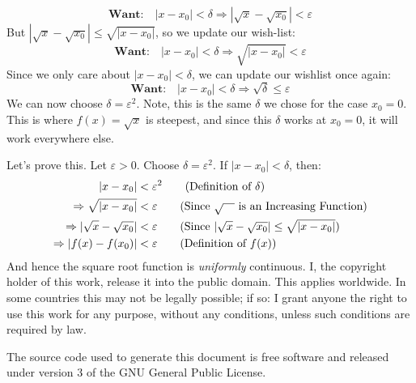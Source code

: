 \documentclass{article}
\theoremstyle{normal}
\theoremstyle{plain}
\begin{document}
    \begin{equation}
        \textbf{Want:}\quad
        |x-x_{0}|<\delta
        \Rightarrow
        |\sqrt{x}-\sqrt{x_{0}}|<\varepsilon
    \end{equation}
    But $|\sqrt{x}-\sqrt{x_{0}}|\leq\sqrt{|x-x_{0}|}$, so we update our
    wish-list:
    \begin{equation}
        \textbf{Want:}\quad
        |x-x_{0}|<\delta
        \Rightarrow
        \sqrt{|x-x_{0}|}<\varepsilon
    \end{equation}
    Since we only care about $|x-x_{0}|<\delta$, we can update our wishlist
    once again:
    \begin{equation}
        \textbf{Want:}\quad
        |x-x_{0}|<\delta
        \Rightarrow
        \sqrt{\delta}\leq\varepsilon
    \end{equation}
    We can now choose $\delta=\varepsilon^{2}$. Note, this is the same
    $\delta$ we chose for the case $x_{0}=0$. This is where $f(x)=\sqrt{x}$ is
    steepest, and since this $\delta$ works at $x_{0}=0$, it will work
    everywhere else.
    \par\hfill\par
    Let's prove this. Let $\varepsilon>0$. Choose $\delta=\varepsilon^{2}$.
    If $|x-x_{0}|<\delta$, then:
    \begin{align}
        |x-x_{0}|&<\varepsilon^{2}
            \tag{Definition of $\delta$}\\
        \Rightarrow
            \sqrt{|x-x_{0}|}&<\varepsilon
                \tag{Since $\sqrt{\hspace{1em}}$ is an Increasing Function}\\
        \Rightarrow
            |\sqrt{x}-\sqrt{x_{0}}|&<\varepsilon
                \tag{Since $|\sqrt{x}-\sqrt{x_{0}}|\leq\sqrt{|x-x_{0}|}$}\\
        \Rightarrow
            |f(x)-f(x_{0})|&<\varepsilon
                \tag{Definition of $f(x)$}
    \end{align}
    And hence the square root function is \textit{uniformly} continuous.
    \newpage
    I, the copyright holder of this work, release it into the public domain.
    This applies worldwide. In some countries this may not be legally possible;
    if so: I grant anyone the right to use this work for any purpose, without
    any conditions, unless such conditions are required by law.
    \par\hfill\par
    The source code used to generate this document is free software and released
    under version 3 of the GNU General Public License.
\end{document}
